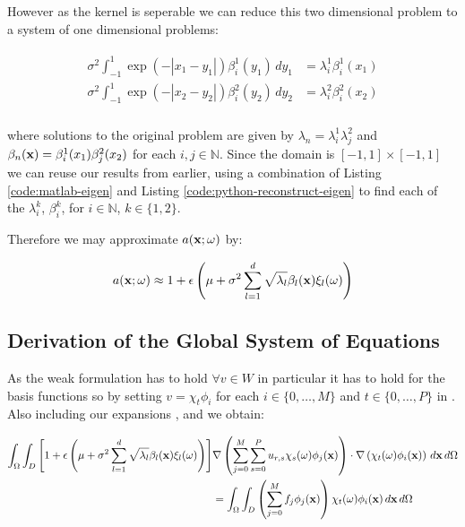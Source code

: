 However as the kernel is seperable we can reduce this two dimensional problem
to a system of one dimensional problems:

\begin{align}
    \begin{split}
        \sigma^2\int_{-1}^1\exp(-|x_1 - y_1|)\beta^1_i(y_1)\, dy_1 &= \lambda^1_i\beta^1_i(x_1) \\
        \sigma^2\int_{-1}^1\exp(-|x_2 - y_2|)\beta^2_i(y_2)\, dy_2 &= \lambda^2_i\beta^2_i(x_2) \\
    \end{split}
\end{align}

where solutions to the original problem
 are given by $\lambda_n =
\lambda^1_i\lambda^2_j$ and $\beta_n(\mathbf{x}) = \beta^1_i(x_1)\beta^2_j(x_2)$ for
each $i, j \in \mathbb{N}$. Since the domain is $[-1, 1] \times [-1, 1]$ we can
reuse our results from earlier, using a combination of Listing
\ref{code:matlab-eigen} and Listing \ref{code:python-reconstruct-eigen} to find
each of the $\lambda_i^k$, $\beta_i^k$, for $i \in \mathbb{N}$, $k \in \{1,
2\}$.

Therefore we may approximate $a(\mathbf{x};\omega)$ by:

\begin{equation}\label{eq:twod-stochastic-kl-kappa}
    a(\mathbf{x};\omega) \approx 1 + \epsilon\left(
        \mu + \sigma^2\sum_{l=1}^d\sqrt{\lambda_l}\beta_l(\mathbf{x})\xi_l(\omega)
    \right)
\end{equation}

\subsection{Derivation of the Global System of Equations}

As the weak formulation  has to hold $\forall v
\in W$ in particular it has to hold for the basis functions so by setting
$v = \chi_t\phi_i$ for each $i \in \{0, \ldots, M\}$ and $t \in \{0, \ldots, P\}$
in . Also including our expansions
,  and
 we obtain:

\begin{align}
  \begin{split}
    \int_\Omega\int_D
    \left[1 + \epsilon\left(\mu +
  \sigma^2\sum_{l=1}^d\sqrt{\lambda_l}\beta_l(\mathbf{x})\xi_l(\omega)\right)\right]
      &\nabla\left(\sum_{j=0}^M\sum_{s=0}^Pu_{r,s}\chi_s(\omega)\phi_j(\mathbf{x})\right)
      \cdot\nabla\left(\chi_t(\omega)\phi_i(\mathbf{x})\right)\, d\mathbf{x}\, d\Omega \\
      &= \int_\Omega\int_D\left(\sum_{j=0}^Mf_j\phi_j(\mathbf{x})\right)
        \chi_t(\omega)\phi_i(\mathbf{x})\, d\mathbf{x}\, d\Omega
  \end{split}
\end{align}


